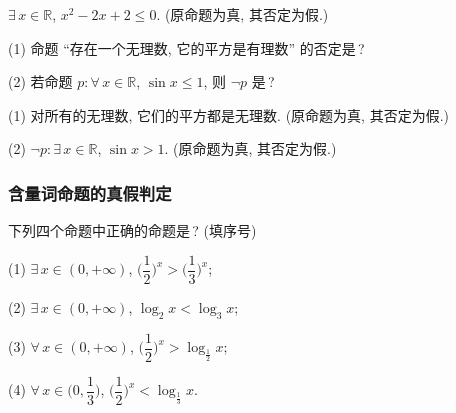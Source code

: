   \beginsolution
    $\exists\, x\in \mathbb{R}$, $x^2-2x+2\leqslant 0$. (原命题为真, 其否定为假.)
  \endsolution
  
  \lianxi
  \begin{exercise}[s]
    (1) 命题 ``存在一个无理数, 它的平方是有理数'' 的否定是\,?
    
    (2) 若命题 $p\colon \forall\, x\in\mathbb{R}$, $\sin x\leqslant1$, 
    则 $\neg p$ 是\,?
  \end{exercise}

  \beginsolution
    (1) 对所有的无理数, 它们的平方都是无理数. (原命题为真, 其否定为假.)
    
    (2) $\neg p\colon \exists\, x\in\mathbb{R}$, $\sin x>1$. (原命题为真, 其否定为假.)
  \endsolution
  
  \subsubsection{含量词命题的真假判定}
  \begin{example}
    下列四个命题中正确的命题是\,? (填序号)
    
    (1) $\exists\, x\in (0,+\infty)$, 
      $\Big(\dfrac12\Big)^x> \Big(\dfrac13\Big)^x$;
      
    (2) $\exists\, x\in (0,+\infty)$, $\log_2 x<\log_3 x$;
    
    (3) $\forall\, x\in (0,+\infty)$, $\Big(\dfrac12\Big)^x> \log_{\frac12} x$;
    
    (4) $\forall\, x\in \Big(0,\dfrac13\Big)$, 
      $\Big(\dfrac12\Big)^x< \log_{\frac13} x$.
  \end{example}

